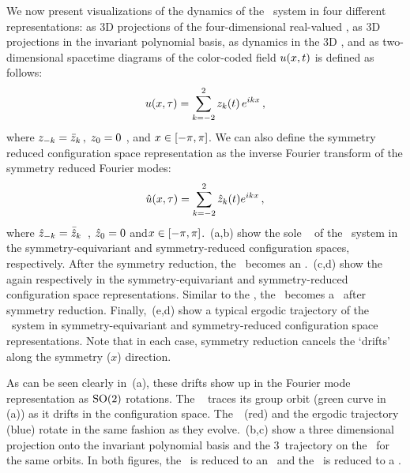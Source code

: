 We now present visualizations of the dynamics of the \twomode\ system in
four different representations: as 3D projections of the four-dimensional
real-valued \statesp, as 3D projections in the invariant polynomial
basis, as dynamics in the 3D \slicePlane, and as two-dimensional
spacetime diagrams of the color-coded field
$u(x,t)$
is defined as follows:
\[
	u(x, \tau) = \sum_{k=-2}^{2} z_k(t) \, e^{i k x}
\,,
\]
where $z_{-k} = \bar{z}_k \,, \; 	z_0 = 0$ ,  and $x
\in [- \pi, \pi]$. We can also define the symmetry reduced configuration
space representation as the inverse Fourier transform of the symmetry
reduced Fourier modes:
\[
	\hat{u}(x, \tau) = \sum_{k=-2}^{2} \hat{z}_k(t) e^{i k x}
\,,
\]
where $\hat{z}_{-k} = \bar{\hat{z}}_k$ \,, \; 	$\hat{z}_0 = 0$ \;
and$x \in [- \pi, \pi]$. \,(a,b) show the
sole \reqv\ \REQV{}{} of the \twomode\ system in the symmetry-equivariant
and symmetry-reduced configuration spaces, respectively. After the
symmetry reduction, the \reqv\ becomes an \eqv.
\,(c,d) show the \rpo\  again
respectively in the symmetry-equivariant and symmetry-reduced
configuration space representations. Similar to the \reqv, the \rpo\
becomes a \po\ after symmetry reduction. Finally,
\,(e,d) show a typical ergodic trajectory of the
\twomode\ system in symmetry-equivariant and symmetry-reduced
configuration space representations. Note that in each case, symmetry
reduction cancels the `drifts' along the symmetry ($x$) direction.

As can be seen clearly in \,(a), these drifts show up in
the Fourier mode representation as $$ rotations. The \reqv\ \REQV{}{}
traces its \SOn{2} group orbit (green curve in \reffig{fig:2modes-ssp}\,(a))
as it drifts in the configuration space. The
\rpo\ \,(red) and the ergodic trajectory (blue) rotate
in the same fashion as they evolve. \refFig{fig:2modes-ssp}\,(b,c)
show a three dimensional projection onto the invariant polynomial basis and the 3\dmn\
trajectory on the \slicePlane\ for the same orbits. In both figures, the \reqv\ is reduced
to an \eqv\ and the \rpo\ is reduced to a \po.
